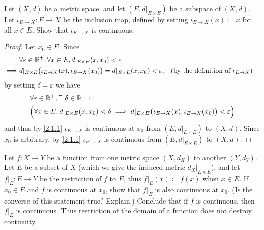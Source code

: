 \begin{ex}\label{ex:2.1.5}
  Let \((X, d)\) be a metric space, and let \((E, d|_{E \times E})\) be a subspace of \((X, d)\).
  Let \(\iota_{E \to X} : E \to X\) be the inclusion map, defined by setting \(\iota_{E \to X}(x) \coloneqq x\) for all \(x \in E\).
  Show that \(\iota_{E \to X}\) is continuous.
\end{ex}

\begin{proof}
  Let \(x_0 \in E\).
  Since
  \begin{align*}
             & \forall \varepsilon \in \mathbb{R}^+, \forall x \in E, d|_{E \times E}(x, x_0) < \varepsilon                                                                              \\
    \implies & d|_{E \times E}\big(\iota_{E \to X}(x), \iota_{E \to X}(x_0)\big) = d|_{E \times E}(x, x_0) < \varepsilon, &  & \text{(by the definition of \(\iota_{E \to X}\))}
  \end{align*}
  by setting \(\delta = \varepsilon\) we have
  \begin{align*}
     & \forall \varepsilon \in \mathbb{R}^+, \exists\ \delta \in \mathbb{R}^+ :                                                                                             \\
     & \Big(\forall x \in E, d|_{E \times E}(x, x_0) < \delta \implies d|_{E \times E}\big(\iota_{E \to X}(x), \iota_{E \to X}(x_0)\big) < \varepsilon\Big)
  \end{align*}
  and thus by \cref{2.1.1} \(\iota_{E \to X}\) is continuous at \(x_0\) from \((E, d|_{E \times E})\) to \((X, d)\).
  Since \(x_0\) is arbitrary, by \cref{2.1.1} \(\iota_{E \to X}\) is continuous from \((E, d|_{E \times E})\) to \((X, d)\).
\end{proof}

\begin{ex}\label{ex:2.1.6}
  Let \(f : X \to Y\) be a function from one metric space \((X, d_X)\) to another \((Y, d_Y)\).
  Let \(E\) be a subset of \(X\) (which we give the induced metric \(d_X|_{E \times E}\)), and let \(f|_E : E \to Y\) be the restriction of \(f\) to \(E\), thus \(f|_E(x) \coloneqq f(x)\) when \(x \in E\).
  If \(x_0 \in E\) and \(f\) is continuous at \(x_0\), show that \(f|_E\) is also continuous at \(x_0\).
  (Is the converse of this statement true? Explain.)
  Conclude that if \(f\) is continuous, then \(f|_E\) is continuous.
  Thus restriction of the domain of a function does not destroy continuity.
\end{ex}

